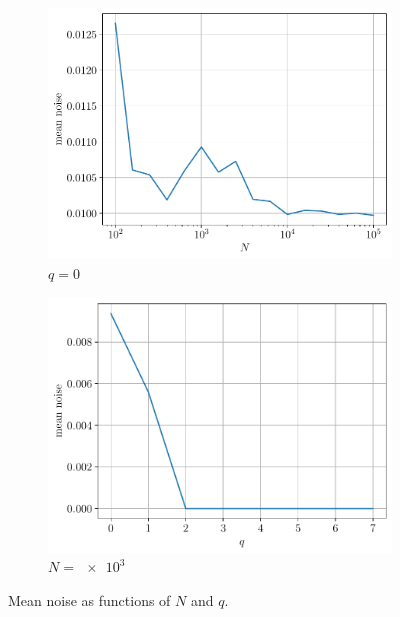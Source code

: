 \documentclass[a4paper, 12pt]{article}
\begin{document}
\begin{enumerate}[label=(\alph*)]
         \begin{figure}[h]
            \centering
            \begin{subfigure}{0.48\textwidth}
                \includegraphics[width=\textwidth]{resources/pdf/mean_noise_n.pdf}
                \caption{$q = 0$}
            \end{subfigure}
            \begin{subfigure}{0.48\textwidth}
                \includegraphics[width=\textwidth]{resources/pdf/mean_noise_q.pdf}
                \caption{$N = \num{e3}$}
            \end{subfigure}
            \caption{Mean noise as functions of $N$ and $q$.}
            \label{fig:mean_noise}
        \end{figure}
        

\end{enumerate}
\end{document}
